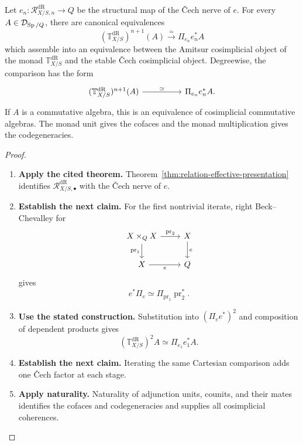 \begin{theorem}
\label{thm:amitsur-identification}
Let \(e_n:\mathcal R^{\mathrm{dR}}_{X/S,n}\to Q\) be the structural map of the
\v{C}ech nerve of \(e\). For every \(A\in\mathcal D_{\operatorname{Sp}/Q}\), there are canonical
equivalences
\[
  (\mathbb T^{\mathrm{dR}}_{X/S})^{n+1}(A)
  \xrightarrow{\simeq}
  \Pi_{e_n}e_n^*A
\]
which assemble into an equivalence between the Amitsur cosimplicial object of the
monad \(\mathbb T^{\mathrm{dR}}_{X/S}\) and the stable \v{C}ech
cosimplicial object.
Degreewise, the comparison has the form
\[
\begin{tikzcd}[column sep=huge]
  (\mathbb T^{\mathrm{dR}}_{X/S})^{n+1}(A)
    \arrow[r,"\simeq"]
  &
  \Pi_{e_n}e_n^*A.
\end{tikzcd}
\]
  If \(A\) is a commutative algebra, this is an equivalence of
cosimplicial commutative algebras. The monad unit gives the cofaces and the monad
multiplication gives the codegeneracies.
\end{theorem}

\begin{proof}
\leavevmode
\begin{enumerate}[label=\textup{(\arabic*)}]
    \item \textbf{Apply the cited theorem.}
    Theorem~\ref{thm:relation-effective-presentation} identifies
    \(\mathcal R^{\mathrm{dR}}_{X/S,\bullet}\) with the \v{C}ech nerve of
    \(e\).
    \item \textbf{Establish the next claim.}
    For the first nontrivial iterate, right Beck--Chevalley for
    \[
    \begin{tikzcd}
    X\times_QX \ar[r,"\operatorname{pr}_2"] \ar[d,"\operatorname{pr}_1"']
    & X \ar[d,"e"]\\
    X \ar[r,"e"'] & Q
    \end{tikzcd}
    \]
    gives
    \[
    e^*\Pi_e
    \simeq
    \Pi_{\operatorname{pr}_1}\operatorname{pr}_2^*.
    \]
    \item \textbf{Use the stated construction.}
    Substitution into \((\Pi_e e^*)^2\) and composition of dependent products
    gives
    \[
    (\mathbb T^{\mathrm{dR}}_{X/S})^2A
    \simeq
    \Pi_{e_1}e_1^*A.
    \]
    \item \textbf{Establish the next claim.}
    Iterating the same Cartesian comparison adds one \v{C}ech factor at each
    stage.
    \item \textbf{Apply naturality.}
    Naturality of adjunction units, counits, and their mates identifies the
    cofaces and codegeneracies and supplies all cosimplicial coherences.
\end{enumerate}
\end{proof}

